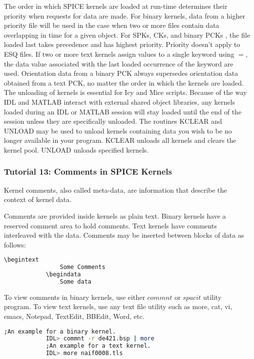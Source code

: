 \documentclass[crop=false,class=article,oneside]{standalone}
\begin{document}
            The order in which SPICE kernels are loaded at run-time determines their priority when requests for data are made. For binary kernels, data from a higher priority file will be used in the case when two or more files contain data overlapping in time for a given object. For SPKs, CKs, and binary PCKs , the file loaded last takes precedence and has highest priority. Priority doesn't apply to ESQ files. If two or more text kernels assign values to a single keyword using $=$, the data value associated with the last loaded occurrence of the keyword are used. Orientation data from a binary PCK always supersedes orientation data obtained from a text PCK, no matter the order in which the kernels are loaded. The unloading of kernels is essential for Icy and Mice scripts. Because of the way IDL and MATLAB interact with external shared object libraries, any kernels loaded during an IDL or MATLAB session will stay loaded until the end of the session unless they are specifically unloaded. The routines KCLEAR and UNLOAD may be used to unload kernels containing data you wish to be no longer available in your program. KCLEAR unloads all kernels and clears the kernel pool. UNLOAD unloads specified kernels.
            \subsubsection{Tutorial 13: Comments in SPICE Kernels}
            \begin{definition}
            Kernel comments, also called meta-data, are information that describe the context of kernel data.
            \end{definition}
            Comments are provided inside kernels as plain text. Binary kernels have a reserved comment area to hold comments. Text kernels have comments interleaved with the data. Comments may be inserted between blocks of data as follows:
            \begin{lstlisting}[language=bash,basicstyle=\footnotesize]
            \begintext
            	Some Comments
            \begindata
            	Some data
            \end{lstlisting}
            To view comments in binary kernels, use either $commnt$ or $spacit$ utility program. To view text kernels, use any text file utility such as more, cat, vi, emacs, Notepad, TextEdit, BBEdit, Word, etc.
            \begin{example}
            \begin{lstlisting}[language=bash,basicstyle=\footnotesize]
            ;An example for a binary kernel.
            IDL> commnt -r de421.bsp | more
            ;An example for a text kernel.
            IDL> more naif0008.tls
            \end{lstlisting}
            \end{example}
\end{document}
